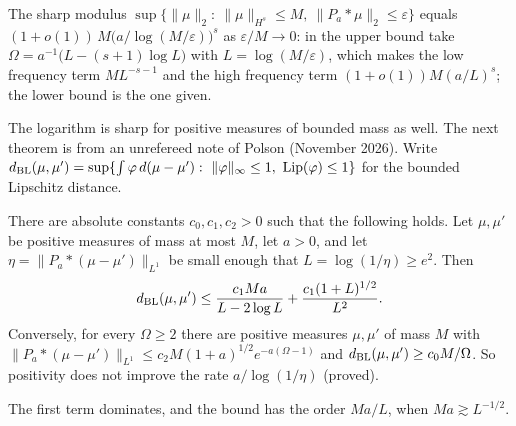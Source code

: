 The sharp modulus $\sup\{\|\mu\|_2:\ \|\mu\|_{H^s}\le M,\ \|P_a*\mu\|_2\le\varepsilon\}$ equals $(1+o(1))\,M\bigl(a/\log(M/\varepsilon)\bigr)^s$ as $\varepsilon/M\to0$: in the upper bound take $\Omega=a^{-1}\bigl(L-(s+1)\log L\bigr)$ with $L=\log(M/\varepsilon)$, which makes the low frequency term $ML^{-s-1}$ and the high frequency term $(1+o(1))M(a/L)^s$; the lower bound is the one given.

The logarithm is sharp for positive measures of bounded mass as well. The next theorem is from an unrefereed note of Polson (November 2026). Write $d_{\rm BL}(\mu,\mu')=\sup\{\int\varphi\,d(\mu-\mu'):\ \|\varphi\|_\infty\le1,\ \mathrm{Lip}(\varphi)\le1\}$ for the bounded Lipschitz distance.

\begin{theorem}\label{cd:thm:rate}
There are absolute constants $c_0,c_1,c_2>0$ such that the following holds. Let $\mu,\mu'$ be positive measures of mass at most $M$, let $a>0$, and let $\eta=\|P_a*(\mu-\mu')\|_{L^1}$ be small enough that $L=\log(1/\eta)\ge e^2$. Then
\[
d_{\rm BL}(\mu,\mu')\le\frac{c_1Ma}{L-2\log L}+\frac{c_1(1+L)^{1/2}}{L^2}.
\]
Conversely, for every $\Omega\ge2$ there are positive measures $\mu,\mu'$ of mass $M$ with $\|P_a*(\mu-\mu')\|_{L^1}\le c_2M(1+a)^{1/2}e^{-a(\Omega-1)}$ and $d_{\rm BL}(\mu,\mu')\ge c_0M/\Omega$. So positivity does not improve the rate $a/\log(1/\eta)$ (proved).
\end{theorem}

The first term dominates, and the bound has the order $Ma/L$, when $Ma\gtrsim L^{-1/2}$.

